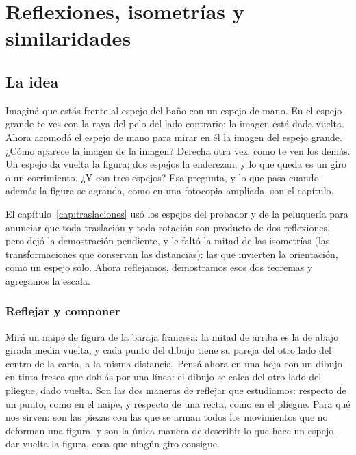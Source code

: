 \chapter{Reflexiones, isometrías y similaridades}\label{cap:reflexiones}\label{sec:bloque-euclideas}

\section{La idea}

Imaginá que estás frente al espejo del baño con un espejo de mano. En el espejo grande te ves
con la raya del pelo del lado contrario: la imagen está dada vuelta. Ahora acomodá el espejo de
mano para mirar en él la imagen del espejo grande. ¿Cómo aparece la imagen de la imagen?
Derecha otra vez, como te ven los demás. Un espejo da vuelta la figura; dos espejos la
enderezan, y lo que queda es un giro o un corrimiento. ¿Y con tres espejos? Esa pregunta, y lo
que pasa cuando además la figura se agranda, como en una fotocopia ampliada, son el capítulo.

El capítulo~\ref{cap:traslaciones} usó los espejos del probador y de la peluquería para
anunciar que toda traslación y toda rotación son producto de dos reflexiones, pero dejó la
demostración pendiente, y le faltó la mitad de las isometrías (las transformaciones que
conservan las distancias): las que invierten la orientación, como un espejo solo. Ahora
reflejamos, demostramos esos dos teoremas y agregamos la escala.

\subsection{Reflejar y componer}\label{sec:reflejar}


Mirá un naipe de figura de la baraja francesa: la mitad de arriba es la de abajo girada media
vuelta, y cada punto del dibujo tiene su pareja del otro lado del centro de la carta, a la misma
distancia. Pensá ahora en una hoja con un dibujo en tinta fresca que doblás por una línea: el
dibujo se calca del otro lado del pliegue, dado vuelta. Son las dos maneras de reflejar que
estudiamos: respecto de un punto, como en el naipe, y respecto de una recta, como en el
pliegue. Para qué nos sirven: son las piezas con las que se arman todos los movimientos que no
deforman una figura, y son la única manera de describir lo que hace un espejo, dar vuelta la
figura, cosa que ningún giro consigue.


